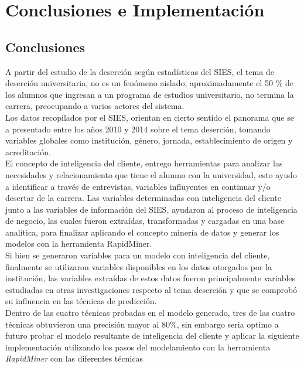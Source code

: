 \chapter[Conclusiones e Implementación]{Conclusiones e Implementación}
\label{ch:conclu}

\section{Conclusiones}
A partir del estudio de la deserción según estadísticas del SIES, el tema de deserción universitaria, no es un fenómeno aislado, aproximadamente el 50 \%  de los alumnos que ingresan a un programa de estudios universitario, no termina la carrera, preocupando a varios actores del sistema.\\

Los datos recopilados por el SIES, orientan en cierto sentido el panorama que se a presentado entre los años 2010 y 2014 sobre el tema deserción, tomando variables globales como institución, género, jornada, establecimiento de origen y acreditación.\\

El concepto de inteligencia del cliente, entrego herramientas para analizar las necesidades y relacionamiento que tiene el alumno con la universidad, esto ayudo a identificar a través de entrevistas, variables influyentes en continuar y/o desertar de la carrera. Las variables determinadas con inteligencia del cliente junto a las variables de información del SIES, ayudaron al proceso de inteligencia de negocio, las cuales fueron extraídas, transformadas y cargadas en una base analítica, para finalizar aplicando el concepto minería de datos y generar los modelos con la herramienta RapidMiner.\\

Si bien se generaron variables para un modelo con inteligencia del cliente, finalmente se utilizaron variables disponibles en los datos otorgados por la institución, las variables extraídas de estos datos fueron principalmente variables estudiadas en otras investigaciones respecto al tema deserción y que se comprobó su influencia en las técnicas de predicción.\\

Dentro de las cuatro técnicas probadas en el modelo generado, tres de las cuatro técnicas obtuvieron una precisión mayor al 80\%, sin embargo seria optimo a futuro probar el modelo resultante de inteligencia del cliente y aplicar la siguiente implementación utilizando los pasos del modelamiento con la herramienta \textit{RapidMiner} con las diferentes técnicas\\


